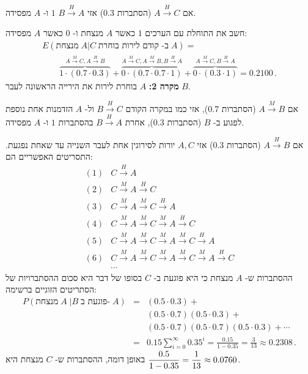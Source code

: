 אם
$A\stackrel{H}{\longrightarrow}C$
(הסתברות
$0.3$)
אזי
$B\stackrel{H}{\longrightarrow}A$
$1$
ו-%
$A$
מפסידה.

חשב את התוחלת עם הערכים
$1$
כאשר 
$A$
מנצחת ו-%
$0$
כאשר
$A$ 
מפסידה:
\vspace*{-3ex}
\[
\renewcommand*{\arraystretch}{2.5}
\begin{array}{l}
E(\textrm{מנצחת}\;A|C\;\textrm{ב- קודם לירות בוחרת}\;A) =\\
\qquad \overbrace{1\cdot (0.7\cdot 0.3)}^{A\stackrel{M}{\longrightarrow}C, A\stackrel{H}{\longrightarrow}B}+ \overbrace{0\cdot (0.7\cdot 0.7\cdot 1)}^{A\stackrel{M}{\longrightarrow}C, A\stackrel{M}{\longrightarrow}B, B\stackrel{H}{\longrightarrow}A}+ \overbrace{0\cdot (0.3\cdot 1)}^{A\stackrel{M}{\longrightarrow}C, B\stackrel{H}{\longrightarrow}A}=0.2100\,.
\end{array}
\]
\textbf{מקרה 2:} $A$
בוחרת לירות את הירייה הראשונה לעבר 
$B$.

אם
$A\stackrel{M}{\longrightarrow}B$
(הסתברות
$0.7$),
אזי כמו במקרה הקודם
$B\stackrel{H}{\longrightarrow}C$
ול-%
$A$
הזדמנות אחת נוספת לפגוע ב-%
$B$
(הסתברות
$0.3$),
אחרת
$B\stackrel{H}{\longrightarrow}A$
בהסתברות
$1$
ו-%
$A$
מפסידה.

אם
$A\stackrel{H}{\longrightarrow}B$
(הסתברות
$0.3$)
אזי
$A,C$
יורות לסירוגין אחת לעבר השנייה עד שאחת נפגעת. התסריטים האפשריים הם:
\[
\begin{array}{ll}
(1)&C\stackrel{H}{\longrightarrow}A\\
(2)&C\stackrel{M}{\longrightarrow}A \stackrel{H}{\longrightarrow}C\\
(3)&C\stackrel{M}{\longrightarrow}A \stackrel{M}{\longrightarrow}C\stackrel{H}{\longrightarrow}A\\
(4)&C\stackrel{M}{\longrightarrow}A \stackrel{M}{\longrightarrow}C\stackrel{M}{\longrightarrow}A\stackrel{H}{\longrightarrow}C\\
(5)&C\stackrel{M}{\longrightarrow}A \stackrel{M}{\longrightarrow}C\stackrel{M}{\longrightarrow}A\stackrel{M}{\longrightarrow}C\stackrel{H}{\longrightarrow}A\\
(6)&C\stackrel{M}{\longrightarrow}A \stackrel{M}{\longrightarrow}C\stackrel{M}{\longrightarrow}A\stackrel{M}{\longrightarrow}C\stackrel{M}{\longrightarrow}A\stackrel{H}{\longrightarrow}C\\
&\cdots
\end{array}
\]
ההסתברות ש-%
$A$
מנצחת כי היא פוגעת ב-%
$C$
בסופו של דבר היא סכום ההסתברויות של הסתריטים הזוגיים ברשימה:
\begin{eqnarray*}
P(\textrm{מנצחת} \;A\;| B\;\textrm{פוגעת ב-}\;A )&=&(0.5 \cdot 0.3) + \\
&&(0.5 \cdot 0.7) (0.5 \cdot 0.3) + \\
&&(0.5 \cdot 0.7) (0.5 \cdot 0.7) (0.5 \cdot 0.3)+ \cdots\\
&=&0.15 \sum_{i=0}^{\infty} 0.35^i= \frac{0.15}{1-0.35}=\frac{3}{13}\approx 0.2308\,.
\end{eqnarray*}
באופן דומה, ההסתברות ש-%
$C$
מנצחת היא
$\displaystyle\frac{0.5}{1-0.35}=\displaystyle\frac{1}{13}\approx 0.0760$.

